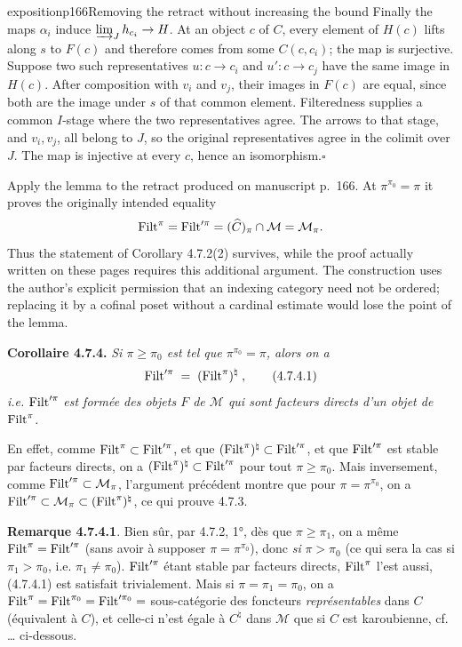 \begin{dcomment}{exposition}{p166}{Removing the retract without increasing the bound}
Finally the maps $\alpha_i$ induce $\varinjlim_Jh_{c_i}\to H$. At an object $c$ of $C$, every element of $H(c)$ lifts along $s$ to $F(c)$ and therefore comes from some $C(c,c_i)$; the map is surjective. Suppose two such representatives $u:c\to c_i$ and $u':c\to c_j$ have the same image in $H(c)$. After composition with $v_i$ and $v_j$, their images in $F(c)$ are equal, since both are the image under $s$ of that common element. Filteredness supplies a common $I$-stage where the two representatives agree. The arrows to that stage, and $v_i,v_j$, all belong to $J$, so the original representatives agree in the colimit over $J$. The map is injective at every $c$, hence an isomorphism.\hfill$\square$

Apply the lemma to the retract produced on manuscript p.~166. At $\pi^{\pi_0}=\pi$ it proves the originally intended equality
\[
 \operatorname{Filt}^\pi=\operatorname{Filt}'^\pi=(\widehat C)_\pi\cap\mathcal M
 =\mathcal M_\pi.
\]
Thus the statement of Corollary 4.7.2(2) survives, while the proof actually written on these pages requires this additional argument. The construction uses the author's explicit permission that an indexing category need not be ordered; replacing it by a cofinal poset without a cardinal estimate would lose the point of the lemma.
\end{dcomment}


\textbf{Corollaire 4.7.4.} \textit{Si $\pi \geqslant \pi_0$ est tel que $\pi^{\pi_0} = \pi$, alors on a}
\[
\operatorname{Filt}'^{\pi} \;=\; (\operatorname{Filt}^{\pi})^{\natural} \;, \tag*{(4.7.4.1)}
\]
\textit{i.e.} $\operatorname{Filt}'^{\pi}$ \textit{est formée des objets $F$ de $\mathcal{M}$ qui sont facteurs directs d’un objet de} $\operatorname{Filt}^{\pi}$.

En effet, comme $\operatorname{Filt}^{\pi} \subset \operatorname{Filt}'^{\pi}$, et que $(\operatorname{Filt}^{\pi})^{\natural} \subset \operatorname{Filt}'^{\pi}$, et que $\operatorname{Filt}'^{\pi}$ est stable par facteurs directs, on a $(\operatorname{Filt}^{\pi})^{\natural} \subset \operatorname{Filt}'^{\pi}$ pour tout $\pi \geqslant \pi_0$. Mais inversement, comme $\operatorname{Filt}'^{\pi} \subset \mathcal{M}_{\pi}$, l’argument précédent montre que pour $\pi = \pi^{\pi_0}$, on a $\operatorname{Filt}'^{\pi} \subset \mathcal{M}_{\pi} \subset (\operatorname{Filt}^{\pi})^{\natural}$, ce qui prouve 4.7.3.

\textbf{Remarque 4.7.4.1}. Bien sûr, par 4.7.2, 1°, dès que $\pi \geqslant \pi_1$, on a même $\operatorname{Filt}^{\pi} = \operatorname{Filt}'^{\pi}$ (sans avoir à supposer $\pi = \pi^{\pi_0}$), donc \textit{si} $\pi > \pi_0$ (ce qui sera la cas si $\pi_1 > \pi_0$, i.e. $\pi_1 \neq \pi_0$). $\operatorname{Filt}'^{\pi}$ étant stable par facteurs directs, $\operatorname{Filt}^{\pi}$ l’est aussi, (4.7.4.1) est satisfait trivialement. Mais si $\pi = \pi_1 = \pi_0$, on a $\operatorname{Filt}^{\pi} = \operatorname{Filt}^{\pi_0} = \operatorname{Filt}'^{\pi_0} =$ sous-catégorie des foncteurs \textit{représentables} dans $C$ (équivalent à $C$), et celle-ci n’est égale à $C^{\natural}$ dans $\mathcal{M}$ que si $C$ est karoubienne, cf. \ldots{} ci-dessous. %

